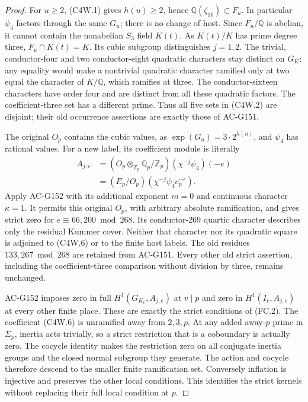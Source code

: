 \begin{proof}
For $u\geq2$, (C4W.1) gives $h(u)\geq2$, hence
$\mathbb Q(\zeta_{16})\subset F_u$.
In particular $\psi_4$ factors through the same $G_u$;
there is no change of host.  Since $F_u/\mathbb Q$ is abelian,
it cannot contain the nonabelian $S_3$ field $K(t)$.
As $K(t)/K$ has prime degree three, $F_u\cap K(t)=K$.
Its cubic subgroup distinguishes $j=1,2$.
The trivial, conductor-four and two conductor-eight quadratic
characters stay distinct on $G_K$: any equality would make a
nontrivial quadratic character ramified only at two equal the
character of $K/\mathbb Q$, which ramifies at three.
The conductor-sixteen characters have order four and are distinct
from all these quadratic factors.  The coefficient-three set
has a different prime.  Thus all five sets in (C4W.2) are disjoint;
their old occurrence assertions are exactly those of AC-G151.

The original $O_p$ contains the cubic values, as
$\exp(G_u)=3\cdot2^{h(u)}$, and $\psi_4$ has rational values.
For a new label, its coefficient module is literally
\[
 \begin{aligned}
 A_{j,e}&=(O_p\otimes_{\mathbb Z_p}\mathbb Q_p/\mathbb Z_p)
                         (\chi^{-j}\psi_4)(-e)\\
        &=(E_p/O_p)(\chi^{-j}\psi_4c_p^{-e}).
 \end{aligned}
 \tag{C4W.6}
\]
Apply AC-G152 with its additional exponent $m=0$ and
continuous character $\kappa=1$.
It permits this original $O_p$, with arbitrary absolute
ramification, and gives strict zero for $e\equiv66,200\bmod268$.
Its conductor-$269$ quartic character describes only the residual
Kummer cover.  Neither that character nor its quadratic square
is adjoined to (C4W.6) or to the finite host labels.
The old residues $133,267\bmod268$ are retained from AC-G151.
Every other old strict assertion, including the coefficient-three
comparison without division by three, remains unchanged.

AC-G152 imposes zero in full $H^1(G_{K_v},A_{j,e})$ at $v\mid p$
and zero in $H^1(I_v,A_{j,e})$ at every other finite place.
These are exactly the strict conditions of (FC.2).
The coefficient (C4W.6) is unramified away from $2,3,p$.
At any added away-$p$ prime in $\Sigma_p$, inertia acts trivially,
so a strict restriction that is a coboundary is actually zero.
The cocycle identity makes the restriction zero on all conjugate
inertia groups and the closed normal subgroup they generate.
The action and cocycle therefore descend to the smaller finite
ramification set.  Conversely inflation is injective and preserves
the other local conditions.  This identifies the strict kernels
without replacing their full local condition at $p$.


\end{proof}
